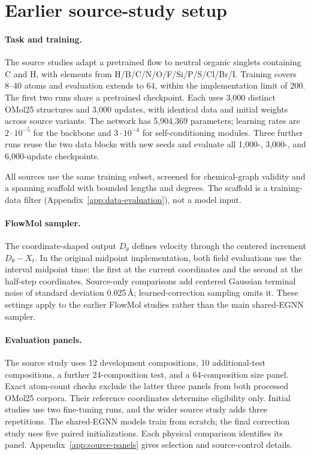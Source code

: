 \section{Earlier source-study setup}\label{app:source-study-setup}
\paragraph{Task and training.}
The source studies adapt a pretrained flow to neutral organic singlets containing C and H, with elements from H/B/C/N/O/F/Si/P/S/Cl/Br/I. Training covers 8--40 atoms and evaluation extends to 64, within the implementation limit of 200. The first two runs share a pretrained checkpoint. Each uses 3,000 distinct OMol25 structures and 3,000 updates, with identical data and initial weights across source variants. The network has 5,904,369 parameters; learning rates are $2\cdot10^{-5}$ for the backbone and $3\cdot10^{-4}$ for self-conditioning modules. Three further runs reuse the two data blocks with new seeds and evaluate all 1,000-, 3,000-, and 6,000-update checkpoints.

All sources use the same training subset, screened for chemical-graph validity and a spanning scaffold with bounded lengths and degrees. The scaffold is a training-data filter (Appendix~\ref{app:data-evaluation}), not a model input.

\paragraph{FlowMol sampler.}
The coordinate-shaped output $D_\theta$ defines velocity through the centered increment $D_\theta-X_t$. In the original midpoint implementation, both field evaluations use the interval midpoint time: the first at the current coordinates and the second at the half-step coordinates. Source-only comparisons add centered Gaussian terminal noise of standard deviation 0.025\,\AA; learned-correction sampling omits it. These settings apply to the earlier FlowMol studies rather than the main shared-EGNN sampler.

\paragraph{Evaluation panels.}
The source study uses 12 development compositions, 10 additional-test compositions, a further 24-composition test, and a 64-composition size panel. Exact atom-count checks exclude the latter three panels from both processed OMol25 corpora. Their reference coordinates determine eligibility only. Initial studies use two fine-tuning runs, and the wider source study adds three repetitions. The shared-EGNN models train from scratch; the final correction study uses five paired initializations. Each physical comparison identifies its panel. Appendix~\ref{app:source-panels} gives selection and source-control details.

